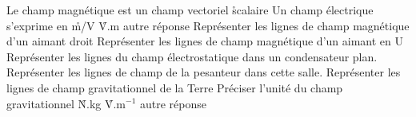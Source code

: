 \q
Le champ magnétique est un champ
\rv
vectoriel
\r
scalaire
\q
Un champ électrique s'exprime en 
\r
m/V
\r
V.m
\rv
autre réponse
\q
Représenter les lignes de champ magnétique d'un aimant droit
\q
Représenter les lignes de champ magnétique d'un aimant en U
\q
Représenter les lignes du champ électrostatique dans un condensateur plan.
\q
Représenter les lignes de champ de la pesanteur dans cette salle.
\q
Représenter les lignes de champ gravitationnel de la Terre
\q
Préciser l'unité du champ gravitationnel
\r
N.kg
\r
V.m$^{-1}$
\rv
autre réponse


